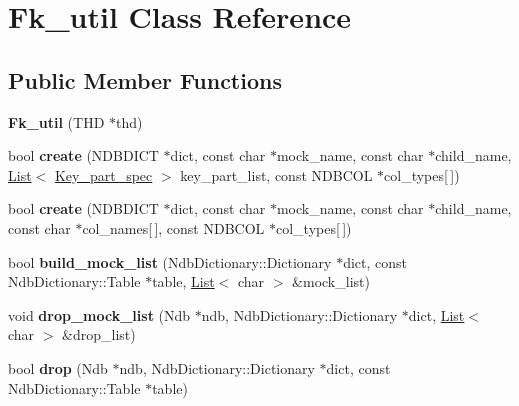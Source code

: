 \hypertarget{classFk__util}{}\section{Fk\+\_\+util Class Reference}
\label{classFk__util}
\subsection*{Public Member Functions}
\begin{DoxyCompactItemize}
\item 
\mbox{\label{classFk__util_a11d60aeb5d3665b5dedce6a8e17d0bce}} 
{\bfseries Fk\+\_\+util} (T\+HD $\ast$thd)
\item 
\mbox{\label{classFk__util_ab02a75767888241901b03d9370fa265b}} 
bool {\bfseries create} (N\+D\+B\+D\+I\+CT $\ast$dict, const char $\ast$mock\+\_\+name, const char $\ast$child\+\_\+name, \mbox{\hyperlink{classList}{List}}$<$ \mbox{\hyperlink{classKey__part__spec}{Key\+\_\+part\+\_\+spec}} $>$ key\+\_\+part\+\_\+list, const N\+D\+B\+C\+OL $\ast$col\+\_\+types\mbox{[}$\,$\mbox{]})
\item 
\mbox{\label{classFk__util_a300ee65050a3aafd5929f5f65d0c17c9}} 
bool {\bfseries create} (N\+D\+B\+D\+I\+CT $\ast$dict, const char $\ast$mock\+\_\+name, const char $\ast$child\+\_\+name, const char $\ast$col\+\_\+names\mbox{[}$\,$\mbox{]}, const N\+D\+B\+C\+OL $\ast$col\+\_\+types\mbox{[}$\,$\mbox{]})
\item 
\mbox{\label{classFk__util_a173b6503450342abe2608b50cb6b88bd}} 
bool {\bfseries build\+\_\+mock\+\_\+list} (Ndb\+Dictionary\+::\+Dictionary $\ast$dict, const Ndb\+Dictionary\+::\+Table $\ast$table, \mbox{\hyperlink{classList}{List}}$<$ char $>$ \&mock\+\_\+list)
\item 
\mbox{\label{classFk__util_aefb2061619fbe488e4e5c9ac990668a7}} 
void {\bfseries drop\+\_\+mock\+\_\+list} (Ndb $\ast$ndb, Ndb\+Dictionary\+::\+Dictionary $\ast$dict, \mbox{\hyperlink{classList}{List}}$<$ char $>$ \&drop\+\_\+list)
\item 
\mbox{\label{classFk__util_acb46d13152d749fff9386def1cb8ac8c}} 
bool {\bfseries drop} (Ndb $\ast$ndb, Ndb\+Dictionary\+::\+Dictionary $\ast$dict, const Ndb\+Dictionary\+::\+Table $\ast$table)

\end{DoxyCompactItemize}
